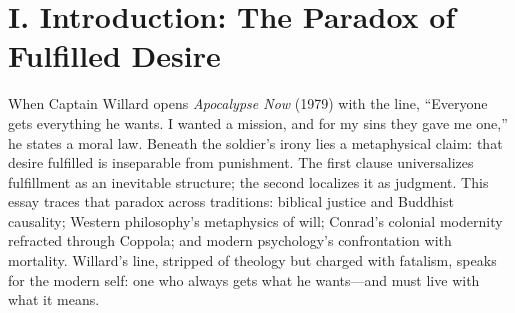 \section*{I. Introduction: The Paradox of Fulfilled Desire}
\label{sec:i-introduction-the-paradox-of-fulfilled-desire}
When Captain Willard opens \textit{Apocalypse Now} (1979) with the line, ``Everyone gets everything he wants. I wanted a mission, and for my sins they gave me one,'' he states a moral law. Beneath the soldier’s irony lies a metaphysical claim: that desire fulfilled is inseparable from punishment. The first clause universalizes fulfillment as an inevitable structure; the second localizes it as judgment. This essay traces that paradox across traditions: biblical justice and Buddhist causality; Western philosophy’s metaphysics of will; Conrad’s colonial modernity refracted through Coppola; and modern psychology’s confrontation with mortality. Willard’s line, stripped of theology but charged with fatalism, speaks for the modern self: one who always gets what he wants—and must live with what it means.
